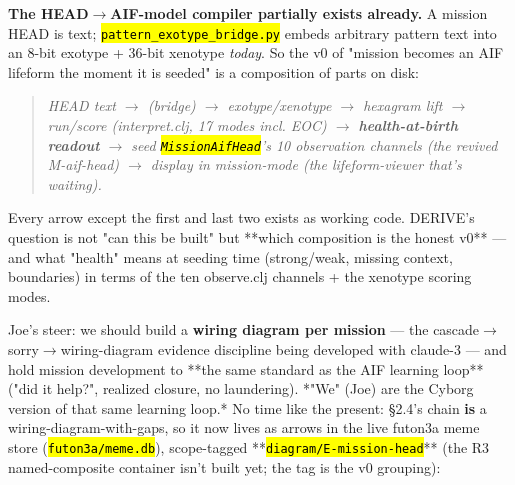 \documentclass[11pt,oneside]{article}
\newcommand{\scopehl}[1]{\texttt{\hl{#1}}}
\begin{document}
\begin{phasebox}[title={2. MAP (2026-06-10) --- autopsy + the futon5 improvisation apparatus}]
\begin{subbox}[title={2.3 The conjecture: mission scopes as early evidence of the 256}]
\end{subbox}
\begin{subbox}[title={2.4 The synthesis MAP hands to DERIVE (the hot finding)}]

\textbf{The HEAD$\rightarrow$AIF-model compiler partially exists already.} A mission HEAD is
text; \scopehl{pattern\_exotype\_bridge.py} embeds arbitrary pattern text into an
8-bit exotype + 36-bit xenotype \emph{today}. So the v0 of "mission becomes an AIF
lifeform the moment it is seeded" is a composition of parts on disk:

\begin{quote}\itshape
HEAD text $\rightarrow$ (bridge) $\rightarrow$ exotype/xenotype $\rightarrow$ hexagram lift $\rightarrow$ run/score
(interpret.clj, 17 modes incl. EOC) $\rightarrow$ \textbf{health-at-birth readout} $\rightarrow$
seed \scopehl{MissionAifHead}'s 10 observation channels (the revived M-aif-head)
$\rightarrow$ display in mission-mode (the lifeform-viewer that's waiting).
\end{quote}

Every arrow except the first and last two exists as working code. DERIVE's
question is not "can this be built" but **which composition is the honest
v0** --- and what "health" means at seeding time (strong/weak, missing context,
boundaries) in terms of the ten observe.clj channels + the xenotype scoring
modes.

\end{subbox}
\begin{subbox}[title={2.5 This mission's own wiring diagram --- written into the meme store (2026-06-10)}]

Joe's steer: we should build a \textbf{wiring diagram per mission} --- the
cascade$\rightarrow$sorry$\rightarrow$wiring-diagram evidence discipline being developed with
claude-3 --- and hold mission development to **the same standard as the AIF
learning loop** ("did it help?", realized closure, no laundering). *"We" (Joe)
are the Cyborg version of that same learning loop.* No time like the present:
\S{}2.4's chain \textbf{is} a wiring-diagram-with-gaps, so it now lives as arrows in
the live futon3a meme store (\scopehl{futon3a/meme.db}), scope-tagged
**\scopehl{diagram/E-mission-head}** (the R3 named-composite container isn't built
yet; the tag is the v0 grouping):


\end{subbox}
\end{phasebox}
\end{document}
